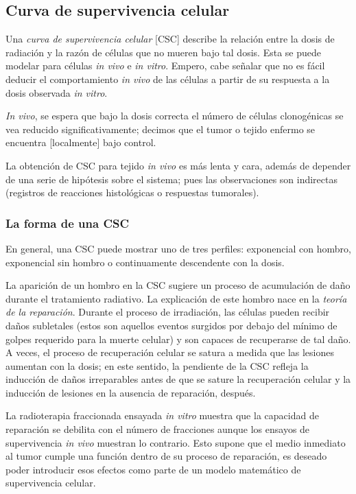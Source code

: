 \documentclass[12pt,letterpaper, oneside]{book}
\begin{document}
			\subsection{Curva de supervivencia celular} 		
			Una \textit{curva de supervivencia celular} [CSC] describe la relación entre la dosis de radiación y la razón de células que no mueren bajo tal dosis\cite{Hall.2000, Tubiana.1990}. Esta se puede modelar para células \textit{in vivo} e \textit{in vitro}. Empero, cabe señalar que no es fácil deducir el comportamiento \textit{in vivo} de las células a partir de su respuesta a la dosis observada \textit{in vitro}\cite{Tubiana.1990}. 
			
			\textit{In vivo}, se espera que bajo la dosis correcta el número de células clonogénicas se vea reducido significativamente; decimos que el tumor o tejido enfermo se encuentra [localmente] bajo control\cite{Tubiana.1990}. 
			
			La obtención de CSC para tejido \textit{in vivo} es más lenta y cara, además de depender de una serie de hipótesis sobre el sistema; pues las observaciones son indirectas (registros de reacciones histológicas o respuestas tumorales)\cite{Tubiana.1990}.
			
				\subsubsection{La forma de una CSC}
				En general, una CSC puede mostrar uno de tres perfiles: exponencial con hombro, exponencial sin hombro o continuamente descendente con la dosis\cite{Bleehen.2007}. 
				
				La aparición de un hombro en la CSC sugiere un proceso de acumulación de daño durante el tratamiento radiativo\cite{Bleehen.2007}. La explicación de este hombro nace en la \textit{teoría de la reparación}. Durante el proceso de irradiación, las células pueden recibir daños subletales (estos son aquellos eventos surgidos por debajo del mínimo de golpes requerido para la muerte celular) y son capaces de recuperarse de tal daño\cite{Bleehen.2007}. A veces, el proceso de recuperación celular se satura a medida que las lesiones aumentan con la dosis; en este sentido, la pendiente de la CSC refleja la inducción de daños irreparables antes de que se sature la recuperación celular y la inducción de lesiones en la ausencia de reparación, después\cite{Bleehen.2007}. 
				
				La radioterapia fraccionada ensayada \textit{in vitro} muestra que la capacidad de reparación se debilita con el número de fracciones aunque los ensayos de supervivencia \textit{in vivo} muestran lo contrario\cite{Bleehen.2007}. Esto supone que el medio inmediato al tumor cumple una función dentro de su proceso de reparación, es deseado poder introducir esos efectos como parte de un modelo matemático de supervivencia celular.
				
\end{document}
